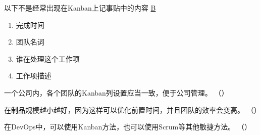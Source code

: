 \begin{problem}
	以下不是经常出现在Kanban上记事贴中的内容
	\uline{B}    
    \vspace{-0.8em}
    \begin{multicols}{2}
        \begin{enumerate}[label=\Alph*.]
            \item 完成时间
            \item 团队名词
            \item 谁在处理这个工作项
            \item 工作项描述
        \end{enumerate}
    \end{multicols}
    \vspace{-1em}
\end{problem}




\begin{problem}
	一个公司内，各个团队的Kanban列设置应当一致，便于公司管理。
    \hfill （）
\end{problem}




\begin{problem}
	在制品规模越小越好，因为这样可以优化前置时间，并且团队的效率会变高。
    \hfill （）
\end{problem}



\begin{problem}
	在DevOps中，可以使用Kanban方法，也可以使用Scrum等其他敏捷方法。
    \hfill （）
\end{problem}

